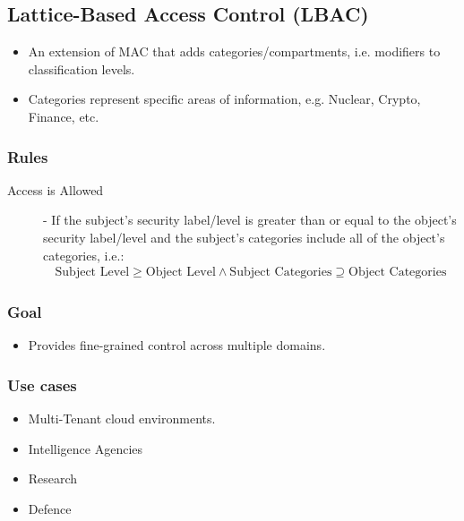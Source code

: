 \documentclass[12pt letter]{report}
\begin{document}
\subsection{Lattice-Based Access Control (LBAC)}
\begin{itemize}
  \item An extension of MAC that adds categories/compartments, i.e.
    modifiers to classification levels.
  \item Categories represent specific areas of information, e.g.
    Nuclear, Crypto, Finance, etc.
\end{itemize}

\subsubsection{Rules}
\begin{description}
  \item[Access is Allowed] - If the subject's security label/level is
    greater than or equal to the object's security label/level and
    the subject's categories include all of the object's categories, i.e.:
    \begin{align*}
      \text{Subject Level} \geq \text{Object Level} \wedge
      \text{Subject Categories} \supseteq \text{Object Categories}
    \end{align*}

\end{description}

\subsubsection{Goal}
\begin{itemize}
  \item Provides fine-grained control across multiple domains.
\end{itemize}

\subsubsection{Use cases}

\begin{itemize}
  \item Multi-Tenant cloud environments.
  \item Intelligence Agencies
  \item  Research
  \item Defence
\end{itemize}
\end{document}
